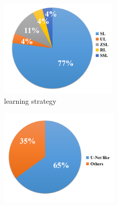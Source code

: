 \documentclass[letterpaper,12pt]{article}
\begin{document}
	\begin{figure}[htbp] 
		\centering 
		
		\begin{subfigure}{0.2\textwidth}
			\includegraphics[width=\linewidth]{learning_strategy}
			\captionsetup{font=scriptsize}
			\caption{learning strategy}
			\label{fig:subfig_a}
		\end{subfigure}
		\begin{subfigure}{0.2\textwidth}
			\includegraphics[width=1.15\linewidth]{network_struture}

\end{subfigure}
\end{figure}
\end{document}

